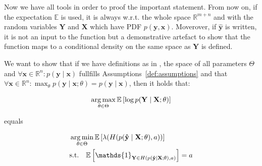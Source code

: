 Now we have all tools in order to proof the important statement. From now on, if the expectation $\mathbb{E}$ is used, it is always w.r.t. the whole space $\mathbb{R}^{m+n}$ and with the random variables $\mathbf{Y}$ and $\mathbf{X}$ which have PDF $p(\mathbf{y}, \mathbf{x})$. Moverover, if $\mathbf{\hat{y}}$ is written, it is not an input to the function but a demonstrative artefact to show that the function maps to a conditional density on the same space as $\mathbf{Y}$ is defined.

\begin{theorem}\label{thm:optimal_cp}
    We want to show that if we have definitions as in , the space of all parameters $\Theta$ and $\forall \mathbf{x}\in\mathbb{R}^n: p(\mathbf{y}\mid \mathbf{x})$ fullfills Assumptions~\ref{def:assumptions} and that $\forall \mathbf{x}\in \mathbb{R}^n: \max_{\theta} p(\mathbf{y} \mid \mathbf{x}; \theta) = p(\mathbf{y} \mid \mathbf{x})$, then it holds that:

    \begin{equation}
        \operatorname*{arg\,max}_{\theta \in \Theta}  \mathbb{E} \left[ \log
        p(\mathbf{Y} \mid \mathbf{X}; \theta) \right]
    \end{equation}

    equals

    \begin{align}
        & \argmin_{\theta \in \Theta} \mathbb{E} \left[
        \lambda(H(p(\mathbf{\hat{y}} \mid \mathbf{X}; \theta), a))
        \right] \\
        & \text{s.t.} \quad \mathbb{E} \left[
        \mathds{1}_{\mathbf{Y} \in
        H(p(\mathbf{\hat{y}} \mid \mathbf{X}; \theta), a)} \right]
        = a
    \end{align}

\end{theorem}

